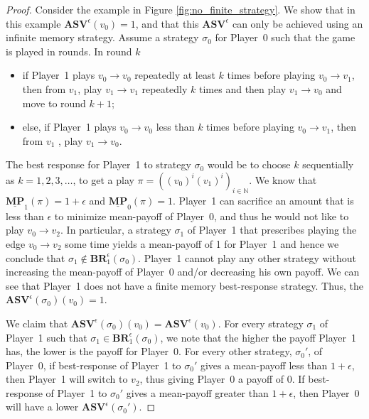 \begin{proof}
Consider the example in Figure \ref{fig:no_finite_strategy}. We show that in this example $\mathbf{ASV}^{\epsilon}(v_0) = 1$, and that this $\mathbf{ASV}^{\epsilon}$ can only be achieved using an infinite memory strategy. Assume a strategy $\sigma_0$ for Player~0
such that the game is played in rounds.
In round $k$
\begin{itemize}[-]
    \item if Player~1 plays $v_0 \to v_0$ repeatedly at least $k$ times before playing $v_0 \to v_1$, then from $v_1$, play $v_1 \to v_1$ repeatedly $k$ times and then play $v_1 \to v_0$ and 
    move to round $k+1$;
    \item else, if Player~1 plays $v_0 \to v_0$ less than $k$ times before playing $v_0 \to v_1$, then from $v_1$ , play $v_1 \to v_0$.
\end{itemize}

The best response for Player~1 to strategy $\sigma_0$ would be to choose $k$ sequentially as $k = 1, 2, 3, \dotsc$, to get a play $\pi = ((v_0)^i(v_1)^i)_{i \in \mathbb{N}}$. We know that $\underline{\mathbf{MP}}_1(\pi) = 1+\epsilon$ and $\underline{\mathbf{MP}}_0(\pi) = 1$. Player~1 can sacrifice an amount that is less than $\epsilon$ to minimize mean-payoff of Player~0, and thus he would not like to play $v_0 \to v_2$. In particular, a strategy $\sigma_1$ of Player~1 that prescribes playing the edge $v_0 \to v_2$ some time 
yields a mean-payoff of 1 for Player~1 and hence we conclude that $\sigma_1 \notin \mathbf{BR}_1^{\epsilon}(\sigma_0)$. Player~1 cannot play any other strategy without increasing the mean-payoff of Player~0 and/or decreasing his own payoff.
We can see that Player~1 does not have a finite memory best-response strategy. Thus, the $\mathbf{ASV}^{\epsilon}(\sigma_0)(v_0) = 1$.

We claim that $\mathbf{ASV}^{\epsilon}(\sigma_0)(v_0) = \mathbf{ASV}^{\epsilon}(v_0)$. For every strategy $\sigma_1$ of Player~1 such that $\sigma_1 \in \mathbf{BR}_1^{\epsilon}(\sigma_0)$, we note that the higher the payoff Player~1 has, the lower is the payoff for Player~0. For every other strategy, $\sigma_0'$, of Player~0, if best-response of Player~1 to $\sigma_0'$ gives a mean-payoff less than $1+\epsilon$, then Player~1 will switch to $v_2$, thus giving Player~0 a payoff of 0. If best-response of Player~1 to $\sigma_0'$ gives a mean-payoff greater than $1+\epsilon$, then Player~0 will have a lower $\mathbf{ASV}^{\epsilon}(\sigma_0')$.


\end{proof}
